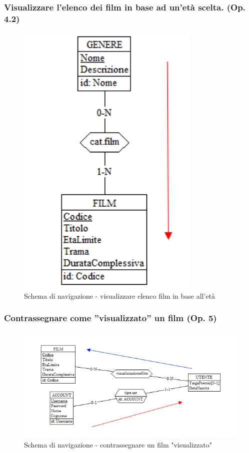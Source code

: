 \documentclass[a4paper,12pt]{report}
\begin{document}
	\subsubsection{Visualizzare l’elenco dei film in base ad un’età scelta. (Op. 4.2)}
	\begin{figure}[H]
		\centering
		\includegraphics[width=250pt]{ER/navigazione/visualizzarefilm.png}
		\caption{Schema di navigazione - visualizzare elenco film in base all'età}
	\end{figure}
	
	\subsubsection{Contrassegnare come ”visualizzato” un film (Op. 5)}
	\begin{figure}[H]
		\centering
		\includegraphics[width=450pt]{ER/navigazione/visualizzatofilm.png}
		\caption{Schema di navigazione - contrassegnare un film "visualizzato"}
	\end{figure}
	
\end{document}
